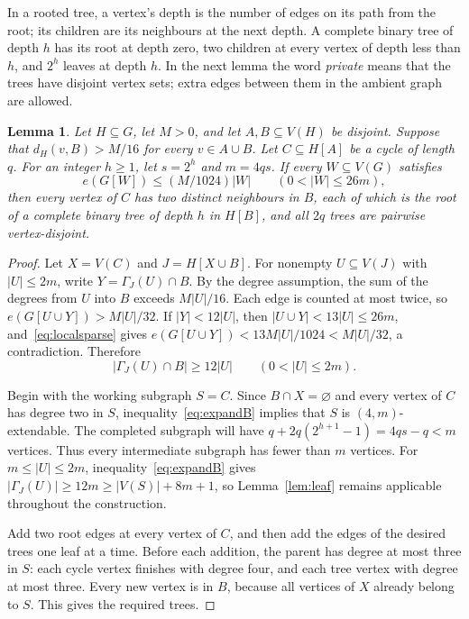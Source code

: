 \documentclass[10pt,letterpaper]{article}
\newtheorem{lemma}[theorem]{Lemma}
\theoremstyle{definition}
\theoremstyle{remark}
\begin{document}
In a rooted tree, a vertex's depth is the number of edges on its path from the root; its children are its neighbours at the next depth. A complete binary tree of depth $h$ has its root at depth zero, two children at every vertex of depth less than $h$, and $2^h$ leaves at depth $h$. In the next lemma the word \emph{private} means that the trees have disjoint vertex sets; extra edges between them in the ambient graph are allowed.

\begin{lemma}\label{lem:trees}
Let $H\subseteq G$, let $M>0$, and let $A,B\subseteq V(H)$ be disjoint. Suppose that $d_H(v,B)>M/16$ for every $v\in A\cup B$. Let $C\subseteq H[A]$ be a cycle of length $q$. For an integer $h\ge1$, let $s=2^h$ and $m=4qs$. If every $W\subseteq V(G)$ satisfies
\begin{equation}\label{eq:localsparse}
e(G[W])\le(M/1024)|W|\qquad(0<|W|\le26m),
\end{equation}
then every vertex of $C$ has two distinct neighbours in $B$, each of which is the root of a complete binary tree of depth $h$ in $H[B]$, and all $2q$ trees are pairwise vertex-disjoint.
\end{lemma}
\begin{proof}
Let $X=V(C)$ and $J=H[X\cup B]$. For nonempty $U\subseteq V(J)$ with $|U|\le2m$, write $Y=\Gamma_J(U)\cap B$. By the degree assumption, the sum of the degrees from $U$ into $B$ exceeds $M|U|/16$. Each edge is counted at most twice, so $e(G[U\cup Y])>M|U|/32$. If $|Y|<12|U|$, then $|U\cup Y|<13|U|\le26m$, and~\eqref{eq:localsparse} gives $e(G[U\cup Y])<13M|U|/1024<M|U|/32$, a contradiction. Therefore
\begin{equation}\label{eq:expandB}
|\Gamma_J(U)\cap B|\ge12|U|\qquad(0<|U|\le2m).
\end{equation}

Begin with the working subgraph $S=C$. Since $B\cap X=\varnothing$ and every vertex of $C$ has degree two in $S$, inequality~\eqref{eq:expandB} implies that $S$ is $(4,m)$-extendable. The completed subgraph will have $q+2q(2^{h+1}-1)=4qs-q<m$ vertices. Thus every intermediate subgraph has fewer than $m$ vertices. For $m\le|U|\le2m$, inequality~\eqref{eq:expandB} gives $|\Gamma_J(U)|\ge12m\ge |V(S)|+8m+1$, so Lemma~\ref{lem:leaf} remains applicable throughout the construction.

Add two root edges at every vertex of $C$, and then add the edges of the desired trees one leaf at a time. Before each addition, the parent has degree at most three in $S$: each cycle vertex finishes with degree four, and each tree vertex with degree at most three. Every new vertex is in $B$, because all vertices of $X$ already belong to $S$. This gives the required trees.
\end{proof}
\end{document}
